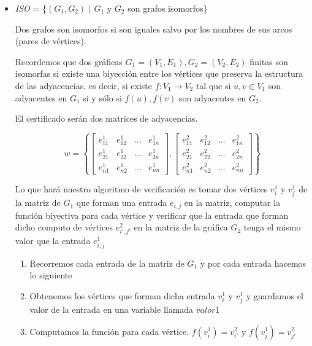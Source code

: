 \documentclass[12pt,letterpaper]{article}
\begin{document}
\begin{itemize}
    
    \item \textit{ISO} = \{$(G_1, G_2)$ $|$ $G_1$ y $G_2$ son grafos isomorfos\} 
    
    Dos grafos son isomorfos si son iguales salvo por los nombres de sus arcos (pares de vértices).
    
    Recordemos que dos gráficas $G_1 = (V_1, E_1), G_2=(V_2, E_2)$ finitas son isomorfas si existe una biyección entre los vértices que preserva la estructura de las adyacencias, es decir, si existe $f: V_1 \rightarrow V_2$ tal que si $u,v \in V_1$ son adyacentes en $G_1$ si y sólo si $f(u), f(v)$ son adyacentes en $G_2$.
    
    El certificado serán dos matrices de adyacencias.
    
    $$w = \left \lbrace 
    \begin{bmatrix}
    e_{11}^1 & e_{12}^1 & ... & e_{1n}^1\\
    e_{21}^1 & e_{22}^1 & ... & e_{2n}^1\\
    e_{n1}^1 & e_{n2}^1 & ... & e_{nn}^1
    \end{bmatrix},    
    \begin{bmatrix}
    e_{11}^2 & e_{12}^2 & ... & e_{1n}^2\\
    e_{21}^2 & e_{22}^2 & ... & e_{2n}^2\\
    e_{n1}^2 & e_{n2}^2 & ... & e_{nn}^2
    \end{bmatrix}
    \right \rbrace$$
    
    Lo que hará nuestro algoritmo de verificación es tomar dos vértices $v^1_{i}$ y $v^1_{j}$ de la matriz de $G_1$ que forman una entrada $e_{i,j}$ en la matriz, computar la función biyectiva para cada vértice y verificar que la entrada que forman dicho computo de vértices $e_{i',j'}^2$ en la matriz de la gráfica $G_2$ tenga el mismo valor que la entrada $e_{i,j}^1$
    
    \begin{enumerate}
    \item Recorremos cada entrada de la matriz de $G_1$ y por cada entrada hacemos lo siguiente
    
    \item Obtenemos los vértices que forman dicha entrada $v_i^1$ y $v_j^1$ y guardamos el valor de la entrada en una variable llamada $valor1$
    
    \item Computamos la función para cada vértice. $f(v_i^1) = v_{i'}^2$ y $f(v_j^1) = v_{j'}^2$
    

\end{enumerate}
\end{itemize}
\end{document}
